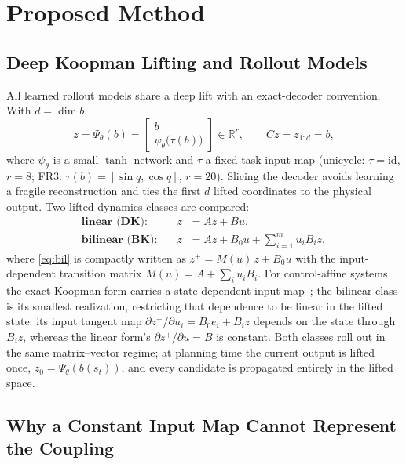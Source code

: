 \documentclass[lettersize,journal]{IEEEtran}
\theoremstyle{remark}
\begin{document}
\section{Proposed Method}\label{sec:method}

\subsection{Deep Koopman Lifting and Rollout Models}\label{subsec:models}

All learned rollout models share a deep lift with an exact-decoder
convention. With $d = \dim b$,
\begin{equation}
z = \Psi_\theta(b) =
\begin{bmatrix} b \\ \psi_\theta\big(\tau(b)\big) \end{bmatrix}
\in \mathbb{R}^{r},
\qquad
C z = z_{1:d} = b,
\label{eq:lift}
\end{equation}
where $\psi_\theta$ is a small $\tanh$ network and $\tau$ a fixed task
input map (unicycle: $\tau = \mathrm{id}$, $r = 8$; FR3:
$\tau(b) = [\sin q, \cos q]$, $r = 20$). Slicing the decoder avoids
learning a fragile reconstruction and ties the first $d$ lifted coordinates
to the physical output. Two lifted dynamics classes are compared:
\begin{align}
\textbf{linear (DK):}\quad
& z^{+} = A z + B u ,
\label{eq:lin}\\[2pt]
\textbf{bilinear (BK):}\quad
& z^{+} = A z + B_0 u + \sum_{i=1}^{m} u_i B_i z ,
\label{eq:bil}
\end{align}
where \eqref{eq:bil} is compactly written as
$z^{+} = M(u)\, z + B_0 u$ with the input-dependent transition matrix
$M(u) = A + \sum_i u_i B_i$. For control-affine systems the exact Koopman
form carries a state-dependent input map~\cite{iacob2024}; the bilinear
class is its smallest realization, restricting that dependence to be
linear in the lifted state: its input tangent map $\partial z^{+} / \partial u_i = B_0 e_i + B_i z$ depends on the
state through $B_i z$, whereas the linear form's
$\partial z^{+}/\partial u = B$ is constant. Both classes roll out in the
same matrix--vector regime; at planning time the current output is lifted
once, $z_0 = \Psi_\theta(b(s_t))$, and every candidate is propagated
entirely in the lifted space.

\subsection{Why a Constant Input Map Cannot Represent the Coupling}\label{subsec:representability}
\end{document}

